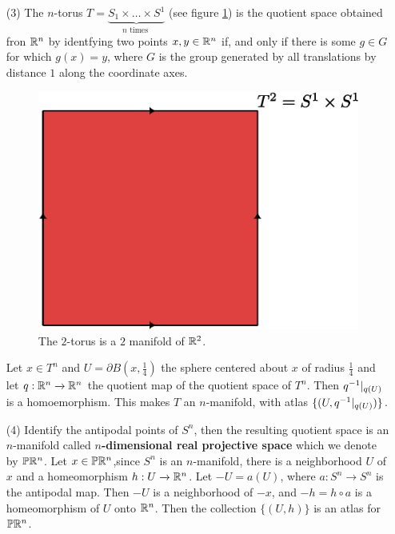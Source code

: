 \begin{example}
\begin{enumerate}
             \item[(3)] The $n$-torus  $T=\underbrace{S_1 \times \dots \times
                 S^1}_{n \text{ times }}$ (see figure \ref{fig_1.2}) is the quotient
                 space obtained fron $\mathbb{R}^n$ by identfying two points  $x,y \in \mathbb{R}^n$
                 if, and only if there is some $g \in G$ for which $g(x)=y$,
                 where $G$ is the group generated by all translations by distance
                 $1$ along the coordinate axes.
                 \begin{figure}[h]
                     \centering
                     \includegraphics[scale=0.5]{Figures/Chapter1/2_torus.eps}
                     \caption{The $2$-torus is a  $2$ manifold of  $\mathbb{R}^2$.}
                     \label{fig_1.2}
                 \end{figure}
                 Let $x \in T^n$ and  $U=\partial{B(x,\frac{1}{4})}$ the
                 sphere centered about $x$ of radius $\frac{1}{4}$ and let
                 $q:\mathbb{R}^n \xrightarrow{} \mathbb{R}^n$ the quotient map of the quotient
                 space of $T^n$. Then  $q^{-1}|_{q(U)}$ is a homoemorphism.
                 This makes $T$ an  $n$-manifold, with atlas
                 $\{(U,q^{-1}|_{q(U)})\}$.

             \item[(4)] Identify the antipodal points of $S^n$, then the
                 resulting quotient space is an $n$-manifold called
                 \textbf{$n$-dimensional real projective space} which we denote
                 by $\mathbb{P}\mathbb{R}^n$. Let $x \in \mathbb{P}\mathbb{R}^n$,since $S^n$ is an  $n$-manifold,
                 there is a neighborhood  $U$ of  $x$ and a homeomorphism $h:U
                 \xrightarrow{} \mathbb{R}^n$. Let $-U=a(U)$, where $a:S^n \xrightarrow{}
                 S^n$ is the antipodal map. Then $-U$ is a neighborhood of
                 $-x$, and  $-h=h \circ a$ is a homeomorphism of  $U$ onto
                 $\mathbb{R}^n$. Then the collection  $\{(U,h)\}$ is an atlas for
                 $\mathbb{P}\mathbb{R}^n$.


\end{enumerate}
\end{example}
